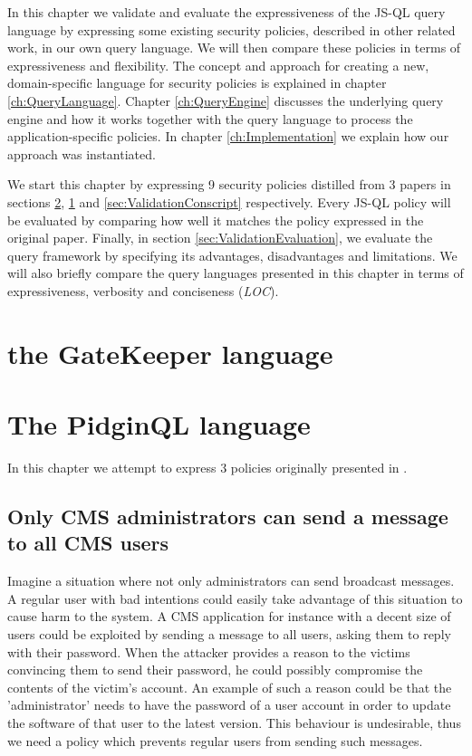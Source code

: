 In this chapter we validate and evaluate the expressiveness of the JS-QL query language by expressing some existing security policies, described in other related work, in our own query language. We will then compare these policies in terms of expressiveness and flexibility. %
The concept and approach for creating a new, domain-specific language for security policies is explained in chapter \ref{ch:QueryLanguage}. Chapter \ref{ch:QueryEngine} discusses the underlying query engine and how it works together with the query language to process the application-specific policies. In chapter \ref{ch:Implementation} we explain how our approach was instantiated.

We start this chapter by expressing 9 security policies distilled from 3 papers in sections \ref{sec:ValidationPidginQL}, \ref{sec:ValidationGK} and \ref{sec:ValidationConscript} respectively. Every JS-QL policy will be evaluated by comparing how well it matches the policy expressed in the original paper. Finally, in section \ref{sec:ValidationEvaluation}, we evaluate the query framework by specifying its advantages, disadvantages and limitations. We will also briefly compare the query languages presented in this chapter in terms of expressiveness, verbosity and conciseness (\textit{LOC}).

\section{the GateKeeper language}
\label{sec:ValidationGK}

\section{The PidginQL language}
\label{sec:ValidationPidginQL}

In this chapter we attempt to express 3 policies originally presented in \cite{PidginQLTechReport}.

\subsection{Only CMS administrators can send a message to all CMS users}
Imagine a situation where not only administrators can send broadcast messages. A regular user with bad intentions could easily take advantage of this situation to cause harm to the system. A CMS application for instance with a decent size of users could be exploited by sending a message to all users, asking them to reply with their password. When the attacker provides a reason to the victims convincing them to send their password, he could possibly compromise the contents of the victim's account. An example of such a reason could be that the 'administrator' needs to have the password of a user account in order to update the software of that user to the latest version. This behaviour is undesirable, thus we need a policy which prevents regular users from sending such messages.

